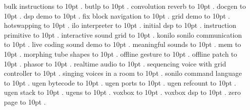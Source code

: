 \smallskip
bulk instructions \leaders\hbox to 10pt {\hss.\hss}  \hfill {}
\smallskip
butlp \leaders\hbox to 10pt {\hss.\hss}  \hfill {}
\smallskip
convolution reverb \leaders\hbox to 10pt {\hss.\hss}  \hfill {}
\smallskip
docgen \leaders\hbox to 10pt {\hss.\hss}  \hfill {}
\smallskip
dsp demo \leaders\hbox to 10pt {\hss.\hss}  \hfill {}
\smallskip
fix block navigation \leaders\hbox to 10pt {\hss.\hss}  \hfill {}
\smallskip
grid demo \leaders\hbox to 10pt {\hss.\hss}  \hfill {}
\smallskip
hotswapping \leaders\hbox to 10pt {\hss.\hss}  \hfill {}
\smallskip
ilo interpreter \leaders\hbox to 10pt {\hss.\hss}  \hfill {}
\smallskip
initial dsp \leaders\hbox to 10pt {\hss.\hss}  \hfill {}
\smallskip
instruction primitive \leaders\hbox to 10pt {\hss.\hss}  \hfill {}
\smallskip
interactive sound grid \leaders\hbox to 10pt {\hss.\hss}  \hfill {}
\smallskip
konilo sonilo communication \leaders\hbox to 10pt {\hss.\hss}  \hfill {}
\smallskip
live coding sound demo \leaders\hbox to 10pt {\hss.\hss}  \hfill {}
\smallskip
meaningful sounds \leaders\hbox to 10pt {\hss.\hss}  \hfill {}
\smallskip
mem \leaders\hbox to 10pt {\hss.\hss}  \hfill {}
\smallskip
morphing tube shapes \leaders\hbox to 10pt {\hss.\hss}  \hfill {}
\smallskip
offline gesture \leaders\hbox to 10pt {\hss.\hss}  \hfill {}
\smallskip
offline patch \leaders\hbox to 10pt {\hss.\hss}  \hfill {}
\smallskip
phasor \leaders\hbox to 10pt {\hss.\hss}  \hfill {}
\smallskip
realtime audio \leaders\hbox to 10pt {\hss.\hss}  \hfill {}
\smallskip
sequencing voice with grid controller \leaders\hbox to 10pt {\hss.\hss}  \hfill {}
\smallskip
singing voices in a room \leaders\hbox to 10pt {\hss.\hss}  \hfill {}
\smallskip
sonilo command language \leaders\hbox to 10pt {\hss.\hss}  \hfill {}
\smallskip
ugen bytecode \leaders\hbox to 10pt {\hss.\hss}  \hfill {}
\smallskip
ugen ports \leaders\hbox to 10pt {\hss.\hss}  \hfill {}
\smallskip
ugen refcount \leaders\hbox to 10pt {\hss.\hss}  \hfill {}
\smallskip
ugen stack \leaders\hbox to 10pt {\hss.\hss}  \hfill {}
\smallskip
ugens \leaders\hbox to 10pt {\hss.\hss}  \hfill {}
\smallskip
voxbox \leaders\hbox to 10pt {\hss.\hss}  \hfill {}
\smallskip
voxbox dsp \leaders\hbox to 10pt {\hss.\hss}  \hfill {}
\smallskip
zero page \leaders\hbox to 10pt {\hss.\hss}  \hfill {}
\smallskip
\par\endgroup
